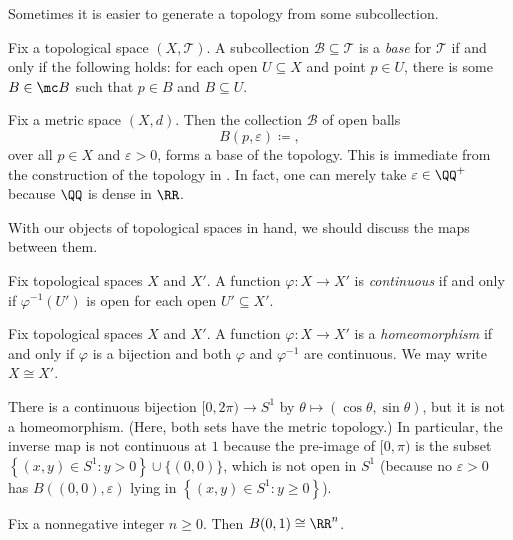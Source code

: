 \documentclass[../notes.tex]{subfiles}
\begin{document}
Sometimes it is easier to generate a topology from some subcollection.
\begin{definition}[base]
	Fix a topological space $(X,\mathcal T)$. A subcollection $\mathcal B\subseteq\mathcal T$ is a \textit{base} for $\mathcal T$ if and only if the following holds: for each open $U\subseteq X$ and point $p\in U$, there is some $B\in\mc B$ such that $p\in B$ and $B\subseteq U$.
\end{definition}
\begin{example}
	Fix a metric space $(X,d)$. Then the collection $\mathcal B$ of open balls
	\[B(p,\varepsilon)\coloneqq,\]
	over all $p\in X$ and $\varepsilon>0$, forms a base of the topology. This is immediate from the construction of the topology in . In fact, one can merely take $\varepsilon\in\QQ^+$ because $\QQ$ is dense in $\RR$.
\end{example}
With our objects of topological spaces in hand, we should discuss the maps between them.
\begin{definition}[continuous]
	Fix topological spaces $X$ and $X'$. A function $\varphi\colon X\to X'$ is \textit{continuous} if and only if $\varphi^{-1}(U')$ is open for each open $U'\subseteq X'$.
\end{definition}
\begin{definition}[homeomorphism]
	Fix topological spaces $X$ and $X'$. A function $\varphi\colon X\to X'$ is a \textit{homeomorphism} if and only if $\varphi$ is a bijection and both $\varphi$ and $\varphi^{-1}$ are continuous. We may write $X\cong X'$.
\end{definition}
\begin{remark}
	There is a continuous bijection $[0,2\pi)\to S^1$ by $\theta\mapsto(\cos\theta,\sin\theta)$, but it is not a homeomorphism. (Here, both sets have the metric topology.) In particular, the inverse map is not continuous at $1$ because the pre-image of $[0,\pi)$ is the subset $\left\{(x,y)\in S^1:y>0\right\}\cup\{(0,0)\}$, which is not open in $S^1$ (because no $\varepsilon>0$ has $B((0,0),\varepsilon)$ lying in $\left\{(x,y)\in S^1:y\ge0\right\}$).
\end{remark}
\begin{exe} \label{exe:ball-homeo-rn}
	Fix a nonnegative integer $n\ge0$. Then $B(0,1)\cong\RR^n$.
\end{exe}
\end{document}
